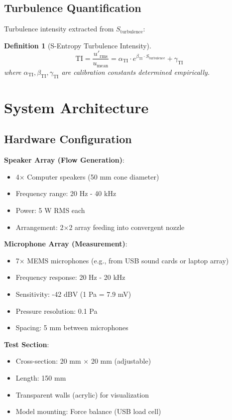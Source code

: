 \documentclass[12pt,a4paper]{article}
\newtheorem{definition}{Definition}
\begin{document}
\subsection{Turbulence Quantification}

Turbulence intensity extracted from $S_{\text{turbulence}}$:

\begin{definition}[S-Entropy Turbulence Intensity]
\begin{equation}
\text{TI} = \frac{u'_{\text{rms}}}{u_{\text{mean}}} = \alpha_{\text{TI}} \cdot e^{\beta_{\text{TI}} \cdot S_{\text{turbulence}}} + \gamma_{\text{TI}}
\end{equation}
where $\alpha_{\text{TI}}, \beta_{\text{TI}}, \gamma_{\text{TI}}$ are calibration constants determined empirically.
\end{definition}

\section{System Architecture}

\subsection{Hardware Configuration}

\textbf{Speaker Array (Flow Generation)}:
\begin{itemize}
\item 4× Computer speakers (50 mm cone diameter)
\item Frequency range: 20 Hz - 40 kHz
\item Power: 5 W RMS each
\item Arrangement: 2×2 array feeding into convergent nozzle
\end{itemize}

\textbf{Microphone Array (Measurement)}:
\begin{itemize}
\item 7× MEMS microphones (e.g., from USB sound cards or laptop array)
\item Frequency response: 20 Hz - 20 kHz
\item Sensitivity: -42 dBV (1 Pa = 7.9 mV)
\item Pressure resolution: 0.1 Pa
\item Spacing: 5 mm between microphones
\end{itemize}

\textbf{Test Section}:
\begin{itemize}
\item Cross-section: 20 mm × 20 mm (adjustable)
\item Length: 150 mm
\item Transparent walls (acrylic) for visualization
\item Model mounting: Force balance (USB load cell)
\end{itemize}
\end{document}
